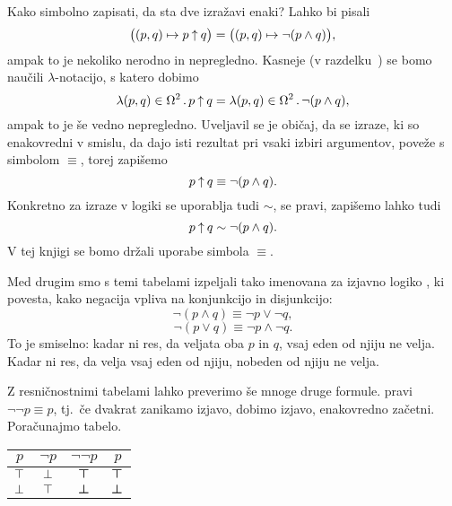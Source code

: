                 Kako simbolno zapisati, da sta dve izražavi enaki? Lahko bi pisali
                \[\big((p, q) \mapsto p \mathbin{\uparrow} q\big) = \big((p, q) \mapsto \lnot(p \land q)\big),\]
                ampak to je nekoliko nerodno in nepregledno. Kasneje (v razdelku~) se bomo naučili $\lambda$-notacijo, s katero dobimo
                \[\xlam{(p, q)}[\tvs^2]{p \shf q} = \xlam{(p, q)}[\tvs^2]{\lnot(p \land q)},\]
                ampak to je še vedno nepregledno. Uveljavil se je običaj, da se izraze, ki so enakovredni v smislu, da dajo isti rezultat pri vsaki izbiri argumentov, poveže s simbolom $\equiv$, torej zapišemo
                \[p \mathbin{\uparrow} q \equiv \lnot(p \land q).\]
                Konkretno za izraze v logiki se uporablja tudi $\sim$, se pravi, zapišemo lahko tudi
                \[p \mathbin{\uparrow} q \sim \lnot(p \land q).\]
                V tej knjigi se bomo držali uporabe simbola $\equiv$. 

                Med drugim smo s temi tabelami izpeljali tako imenovana  za izjavno logiko , ki povesta, kako negacija vpliva na konjunkcijo in disjunkcijo:
                \[\lnot(p \land q) \equiv \lnot{p} \lor \lnot{q},\]
                \[\lnot(p \lor q) \equiv \lnot{p} \land \lnot{q}.\]
                To je smiselno: kadar ni res, da veljata oba $p$ in $q$, vsaj eden od njiju ne velja. Kadar ni res, da velja vsaj eden od njiju, nobeden od njiju ne velja.

                Z resničnostnimi tabelami lahko preverimo še mnoge druge formule.  pravi $\lnot\lnot{p} \equiv p$, tj.~če dvakrat zanikamo izjavo, dobimo izjavo, enakovredno začetni. Poračunajmo tabelo.

                \begin{center}
                        \begin{tabular}{c|ccc}
                                $p$ & $\lnot{p}$ & $\lnot\lnot{p}$ & $p$ \\
                                \hline
                                $\top$ & $\bot$ & $\bm{\top}$ & $\bm{\top}$ \\
                                $\bot$ & $\top$ & $\bm{\bot}$ & $\bm{\bot}$
                        \end{tabular}
                \end{center}

